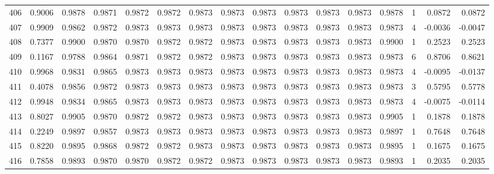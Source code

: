 \begin{tabular}{lrrrrrrrrrrrrrrr}
406 &      0.9006 &  0.9878 &  0.9871 &  0.9872 &  0.9872 &  0.9873 &  0.9873 &  0.9873 &  0.9873 &  0.9873 &   0.9873 &     0.9878 &      1 &                    0.0872 &                     0.0872 \\
407 &      0.9909 &  0.9862 &  0.9872 &  0.9873 &  0.9873 &  0.9873 &  0.9873 &  0.9873 &  0.9873 &  0.9873 &   0.9873 &     0.9873 &      4 &                   -0.0036 &                    -0.0047 \\
408 &      0.7377 &  0.9900 &  0.9870 &  0.9870 &  0.9872 &  0.9872 &  0.9873 &  0.9873 &  0.9873 &  0.9873 &   0.9873 &     0.9900 &      1 &                    0.2523 &                     0.2523 \\
409 &      0.1167 &  0.9788 &  0.9864 &  0.9871 &  0.9872 &  0.9872 &  0.9873 &  0.9873 &  0.9873 &  0.9873 &   0.9873 &     0.9873 &      6 &                    0.8706 &                     0.8621 \\
410 &      0.9968 &  0.9831 &  0.9865 &  0.9873 &  0.9873 &  0.9873 &  0.9873 &  0.9873 &  0.9873 &  0.9873 &   0.9873 &     0.9873 &      4 &                   -0.0095 &                    -0.0137 \\
411 &      0.4078 &  0.9856 &  0.9872 &  0.9873 &  0.9873 &  0.9873 &  0.9873 &  0.9873 &  0.9873 &  0.9873 &   0.9873 &     0.9873 &      3 &                    0.5795 &                     0.5778 \\
412 &      0.9948 &  0.9834 &  0.9865 &  0.9873 &  0.9873 &  0.9873 &  0.9873 &  0.9873 &  0.9873 &  0.9873 &   0.9873 &     0.9873 &      4 &                   -0.0075 &                    -0.0114 \\
413 &      0.8027 &  0.9905 &  0.9870 &  0.9872 &  0.9872 &  0.9873 &  0.9873 &  0.9873 &  0.9873 &  0.9873 &   0.9873 &     0.9905 &      1 &                    0.1878 &                     0.1878 \\
414 &      0.2249 &  0.9897 &  0.9857 &  0.9873 &  0.9873 &  0.9873 &  0.9873 &  0.9873 &  0.9873 &  0.9873 &   0.9873 &     0.9897 &      1 &                    0.7648 &                     0.7648 \\
415 &      0.8220 &  0.9895 &  0.9868 &  0.9872 &  0.9872 &  0.9873 &  0.9873 &  0.9873 &  0.9873 &  0.9873 &   0.9873 &     0.9895 &      1 &                    0.1675 &                     0.1675 \\
416 &      0.7858 &  0.9893 &  0.9870 &  0.9870 &  0.9872 &  0.9872 &  0.9873 &  0.9873 &  0.9873 &  0.9873 &   0.9873 &     0.9893 &      1 &                    0.2035 &                     0.2035 \\

\end{tabular}
